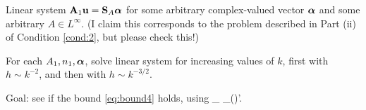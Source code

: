 \item Linear system $\mathbf{A}_{1} \mathbf{u} = \mathbf{S}_{A} {\boldsymbol{\alpha}}$ for some arbitrary complex-valued vector ${\boldsymbol{\alpha}}$ and some arbitrary $A\in L^\infty$. (I claim this corresponds to the problem described in Part (ii) of Condition \ref{cond:2},  but please check this!)
\item For each $A_{1}, n_{1}, {\boldsymbol{\alpha}}$, solve linear system for increasing values of $k$, first with $h\sim k^{-2}$, and then with $h\sim k^{-3/2}$.
\item Goal: see if the bound \eqref{eq:bound4} holds, using 
\beqs
{}_{\LtDR} \quad {} \quad {}_{(\HokDR)'}.
\eeqs
\eit
\een

